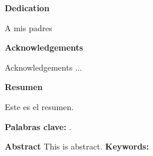 \thispagestyle{empty} \textbf{}\normalsize
\vspace{1.5cm}%
\textbf{Dedication}\vspace{4.5cm}

\begin{flushright}
\begin{minipage}{8cm}
    \noindent
        \small
        A mis padres\vspace{1.5cm}
\end{minipage}
\end{flushright}


\newpage
\thispagestyle{empty} \textbf{}\normalsize
\vspace{1.5cm}%
\textbf{\LARGE Acknowledgements}
\vspace{1.5cm}
Acknowledgements ...
\vspace{0.5cm}


\newpage
\textbf{\LARGE Resumen}
\vspace{1.5cm}
Este es el resumen.\vspace{0.5cm}

\textbf{\small Palabras clave: }.\vspace{0.5cm}


 
\textbf{\LARGE Abstract}\vspace{1.5cm}
This is abstract.\vspace{1.5cm}
\textbf{\small Keywords: }\vspace{0.5cm}